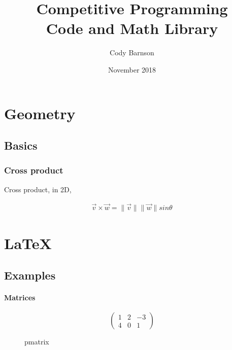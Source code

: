 \documentclass{article}
\renewcommand{\thesubsection}{\arabic{subsection}}
\begin{document}
\title{Competitive Programming\\Code and Math Library}
\author{Cody Barnson}
\date{November 2018}


\maketitle

\tableofcontents
\newpage



\makeatletter
\newcommand{\vo}{\vec{}}



\section*{Geometry}

\subsection{Basics}

\subsubsection{Cross product}

Cross product, in 2D, 

\begin{align*}
    \vec{v} \times \vec{w} = \lVert \vec{v} \lVert \lVert \vec{w} \lVert sin \theta
\end{align*}

\section*{LaTeX}

\subsection{Examples}

\paragraph{Matrices}

\begin{figure}[H]
	\centering
	\[
		\begin{pmatrix}1 & 2 & -3 \\ 4 & 0 & 1\end{pmatrix}
	\]
	\caption{pmatrix}
	\label{fig:pmatrix}
\end{figure}
\end{document}
